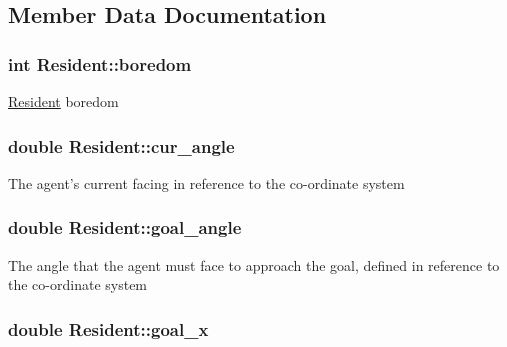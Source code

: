 \subsection{Member Data Documentation}
\hypertarget{classResident_acc61e75ef963ee7a6945b4d2ae9c55e6}{
\subsubsection[{boredom}]{\setlength{\rightskip}{0pt plus 5cm}int Resident\-::boredom\hspace{0.3cm}{\ttfamily [protected]}}}\label{classResident_acc61e75ef963ee7a6945b4d2ae9c55e6}
\hyperlink{classResident}{Resident} boredom \hypertarget{classResident_a4781565db7a2e58566d2120623fbc13e}{
\subsubsection[{cur\-\_\-angle}]{\setlength{\rightskip}{0pt plus 5cm}double Resident\-::cur\-\_\-angle\hspace{0.3cm}{\ttfamily [protected]}}}\label{classResident_a4781565db7a2e58566d2120623fbc13e}
The agent's current facing in reference to the co-\/ordinate system \hypertarget{classResident_a194117576f1937cac43ac1b05b884085}{
\subsubsection[{goal\-\_\-angle}]{\setlength{\rightskip}{0pt plus 5cm}double Resident\-::goal\-\_\-angle\hspace{0.3cm}{\ttfamily [protected]}}}\label{classResident_a194117576f1937cac43ac1b05b884085}
The angle that the agent must face to approach the goal, defined in reference to the co-\/ordinate system \hypertarget{classResident_adee57a6649dfa4a41d027fbb8d961226}{
\subsubsection[{goal\-\_\-x}]{\setlength{\rightskip}{0pt plus 5cm}double Resident\-::goal\-\_\-x\hspace{0.3cm}{\ttfamily [protected]}}}\label{classResident_adee57a6649dfa4a41d027fbb8d961226}

